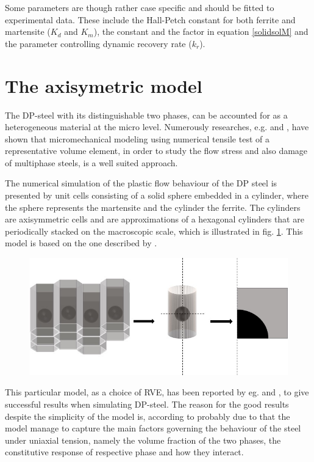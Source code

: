 \documentclass{article}
\begin{document}
Some parameters are though rather case specific and should be fitted to experimental data. These include the Hall-Petch constant for both ferrite and martensite ($K_d$ and $K_m$), the constant and the factor in equation \ref{solidsolM} and the parameter controlling dynamic recovery rate ($k_r$). 

\section{The axisymetric model}
\label{Section:Axisym}
The DP-steel with its distinguishable two phases, can be accounted for as a heterogeneous material at the micro level. Numerously researches, e.g. \cite{Ramazani} and \cite{Uthaisangsuk},  have shown that micromechanical modeling using numerical tensile test of a representative volume element, in order to study the flow stress and also damage of multiphase steels, is a well suited approach. 

The numerical simulation of the plastic flow behaviour of the DP steel is presented by unit cells consisting of a solid sphere embedded in a cylinder, where the sphere represents the martensite and the cylinder the ferrite. The cylinders are axisymmetric cells and are approximations of a hexagonal cylinders that are periodically stacked on the macroscopic scale, which is illustrated in fig. \ref{fig:PeriodicaRVE}. This model is based on the one described by \cite{Lai}. 

\begin{figure}[h!]
    \includegraphics[width=\linewidth]{PeriodicRVE.jpg}
    \caption{}
    \label{fig:PeriodicaRVE}

\end{figure}

This particular model, as a choice of RVE, has been reported by eg. \cite{Al-Abbasi2003} and \cite{Lai}, to give successful results when simulating DP-steel. The reason for the good results despite the simplicity of the model is, according to \cite{Lai} probably due to that the model manage to capture the main factors governing the behaviour of the steel under uniaxial tension, namely the volume fraction of the two phases, the constitutive response of respective phase and how they interact. 
\end{document}
